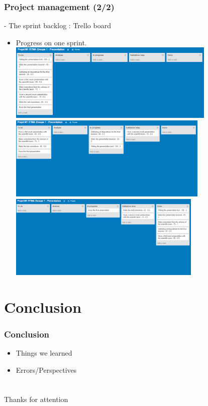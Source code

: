 \documentclass[xcolor=table]{beamer}
\begin{document}
\begin{frame}\frametitle{Project management (2/2)}

- The sprint backlog : Trello board

\begin{itemize}

\item<1-> Progress on one sprint.\vspace{0.5cm}
 {\includegraphics[height=3.7cm]{trello1.png}} %
 {\includegraphics[height=4cm]{trello2.png}}
 {\includegraphics[height=4cm]{trello3.png}}
\end{itemize}

\end{frame}

\section{Conclusion}
\begin{frame}\frametitle{Conclusion}
   \begin{itemize}
        \item Things we learned
        \item Errors/Perspectives
    \end{itemize}

\end{frame}


\section{}
\begin{frame}\frametitle{}
    \begin{center}
        Thanks for attention
    \end{center}
\end{frame}
\end{document}
